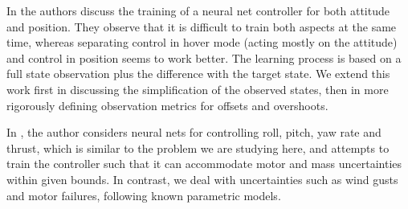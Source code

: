 \documentclass[anonymous=true,format=sigconf, screen=true, review=false]{acmart}
\begin{document}
In \cite{Koning} the authors discuss the training of a neural net controller for both attitude and position. They observe that it is difficult to train both aspects at the same time, whereas separating control in hover mode (acting mostly on the attitude) and control in position seems to work better. %
The learning process is based on a full state observation plus the difference with the target state. We extend this work first in discussing the simplification of the observed states, then in more rigorously defining observation metrics for offsets and overshoots.

In \cite{stockholm}, the author considers neural nets for controlling roll, pitch, yaw rate and thrust, which is similar to the problem we are studying here, and attempts to train the controller such that it can accommodate motor and mass uncertainties within given bounds. In contrast, we deal with uncertainties such as wind gusts and motor failures, following known parametric models.



\end{document}
